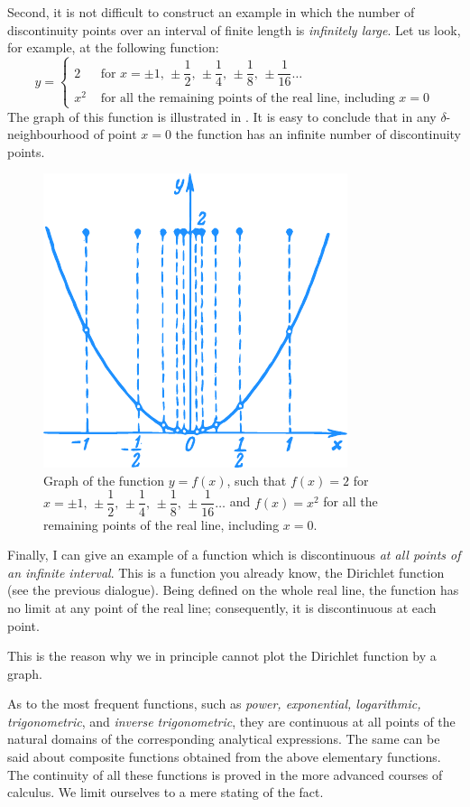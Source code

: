 {Second, it is not difficult to construct an example in which the number of discontinuity points over an interval of finite length is \emph{infinitely large}. Let us look, for example, at the following function:
\begin{equation*}%
y =
\begin{cases}
2 & \,\, \text{for} \,\, x= \pm 1, \, \pm \dfrac{1}{2},\, \pm \dfrac{1}{4},\, \pm \dfrac{1}{8},\, \pm \dfrac{1}{16} \ldots \\
x^{2} & \,\, \text{for all the remaining points of the real line, including} \,\, x = 0
\end{cases}
\end{equation*}
The graph of this function is illustrated in . It is easy to conclude that in any $\delta$-neighbourhood of point $x = 0$ the function has an infinite number of discontinuity points.
\begin{figure}[!ht]%
\centering
\includegraphics[width=.7\textwidth]{figures/fig-29.pdf}
\caption{Graph of the function $y = f(x)$, such that $f(x) = 2$ for $ x= \pm 1, \, \pm \dfrac{1}{2},\, \pm \dfrac{1}{4},\, \pm \dfrac{1}{8},\, \pm \dfrac{1}{16} \ldots $ and $f(x) = x^{2}$ for all the remaining points of the real line, including $x = 0$.}
\label{fig-29}
\end{figure}

Finally, I can give an example of a function which is discontinuous \emph{at all points of an infinite interval}. This is a function you already know, the Dirichlet function (see the previous dialogue). Being defined on the whole real line, the function has no limit at any point of the real line; consequently, it is discontinuous at each point.

\rdr This is the reason why we in principle cannot plot the Dirichlet function by a graph.

\athr As to the most frequent functions, such as \emph{power, exponential, logarithmic, trigonometric}, and \emph{inverse trigonometric}, they are continuous at all points of the natural domains of the corresponding analytical expressions. The same can be said about composite functions obtained from the above elementary functions. The continuity of all these functions is proved in the more advanced courses of calculus. We limit ourselves to a mere stating of the fact.
}